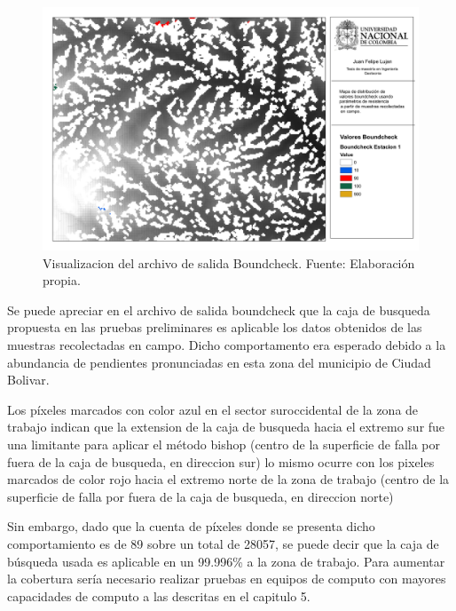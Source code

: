 \begin{figure}[H]
\centering
\includegraphics[scale=0.3]{img/boundcheckCampo.pdf}
\caption{Visualizacion del archivo de salida Boundcheck. Fuente: Elaboraci\'on propia.}
\label{fig:dem usado}
\end{figure}

Se puede apreciar en el archivo de salida \textsf{boundcheck} que la caja de busqueda propuesta en las pruebas preliminares es aplicable los datos obtenidos de las muestras recolectadas en campo. Dicho comportamento era esperado debido a la abundancia de pendientes pronunciadas en esta zona del municipio de Ciudad Bolivar.

Los p\'ixeles marcados con color azul en el sector suroccidental de la zona de trabajo indican que la extension de la caja de busqueda hacia el extremo sur fue una limitante para aplicar el m\'etodo bishop (centro de la superficie de falla por fuera de la caja de busqueda, en direccion sur) lo mismo ocurre con los pixeles marcados de color rojo hacia el extremo norte de la zona de trabajo (centro de la superficie de falla por fuera de la caja de busqueda, en direccion norte)

Sin embargo, dado que la cuenta de p\'ixeles donde se presenta dicho comportamiento es de 89 sobre un total de 28057, se puede decir que la caja de b\'usqueda usada es aplicable en un 99.996\% a la zona de trabajo.
Para aumentar la cobertura ser\'ia necesario realizar pruebas en equipos de computo con mayores capacidades de computo a las descritas en el capitulo 5.


